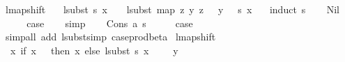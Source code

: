 \begin{isabellebody}
\isamarkupfalse%
%
\endisatagproof
{\isafoldproof}%
%
\isadelimproof
\isanewline
%
\endisadelimproof
\isanewline
\isanewline
{}\isamarkupfalse%
\ lmap{\isacharunderscore}{\kern0pt}shift{\isacharcolon}{\kern0pt}\isanewline
\ \ \ {\isachardoublequoteopen}{\isacharparenleft}{\kern0pt}lsubst\ s{\isacharparenright}{\kern0pt}\ x\ {\isacharplus}{\kern0pt}\ {}\ {\isacharequal}{\kern0pt}\ lsubst\ {\isacharparenleft}{\kern0pt}map\ {\isacharparenleft}{\kern0pt}{\isasymlambda}{\isacharparenleft}{\kern0pt}z{\isacharcomma}{\kern0pt}\ y{\isacharparenright}{\kern0pt}{\isachardot}{\kern0pt}\ {\isacharparenleft}{\kern0pt}z\ {\isacharplus}{\kern0pt}\ {}{\isacharcomma}{\kern0pt}\ y\ {\isacharplus}{\kern0pt}\ {}{\isacharparenright}{\kern0pt}{\isacharparenright}{\kern0pt}\ s{\isacharparenright}{\kern0pt}\ {\isacharparenleft}{\kern0pt}x\ {\isacharplus}{\kern0pt}\ {}{\isacharparenright}{\kern0pt}{\isachardoublequoteclose}\isanewline
%
\isadelimproof
%
\endisadelimproof
%
\isatagproof
{}\isamarkupfalse%
\ {\isacharparenleft}{\kern0pt}induct\ s{\isacharparenright}{\kern0pt}\isanewline
\ \ \isamarkupfalse%
\ Nil\isanewline
\ \ \isamarkupfalse%
\ \isamarkupfalse%
\ {\isacharquery}{\kern0pt}case\isanewline
\ \ \isamarkupfalse%
\ simp\isanewline
{}\isamarkupfalse%
\isanewline
\ \ \isamarkupfalse%
\ {\isacharparenleft}{\kern0pt}Cons\ a\ s{\isacharparenright}{\kern0pt}\isanewline
\ \ \isamarkupfalse%
\ \isamarkupfalse%
\ {\isacharquery}{\kern0pt}case\isanewline
\ \ \isamarkupfalse%
\ {\isacharparenleft}{\kern0pt}simp{\isacharunderscore}{\kern0pt}all\ add{\isacharcolon}{\kern0pt}\ lsubst{\isacharunderscore}{\kern0pt}simp\ case{\isacharunderscore}{\kern0pt}prod{\isacharunderscore}{\kern0pt}beta{\isacharparenright}{\kern0pt}\isanewline
{}\isamarkupfalse%
%
\endisatagproof
{\isafoldproof}%
%
\isadelimproof
\isanewline
%
\endisadelimproof
\isanewline
\isanewline
{}\isamarkupfalse%
\ lmap{\isacharunderscore}{\kern0pt}shift{}{\isacharcolon}{\kern0pt}\isanewline
\ \ {\isachardoublequoteopen}{\isacharparenleft}{\kern0pt}{\isasymlambda}x{\isachardot}{\kern0pt}\ if\ x\ {\isacharequal}{\kern0pt}\ {}\ then\ x\ else\ {\isacharparenleft}{\kern0pt}{\isacharparenleft}{\kern0pt}lsubst\ s{\isacharparenright}{\kern0pt}\ {\isacharparenleft}{\kern0pt}x\ {\isacharminus}{\kern0pt}\ {}{\isacharparenright}{\kern0pt}\ {\isacharplus}{\kern0pt}\ {}{\isacharparenright}{\kern0pt}{\isacharparenright}{\kern0pt}\ y\ {\isacharequal}{\kern0pt}\isanewline

\end{isabellebody}
